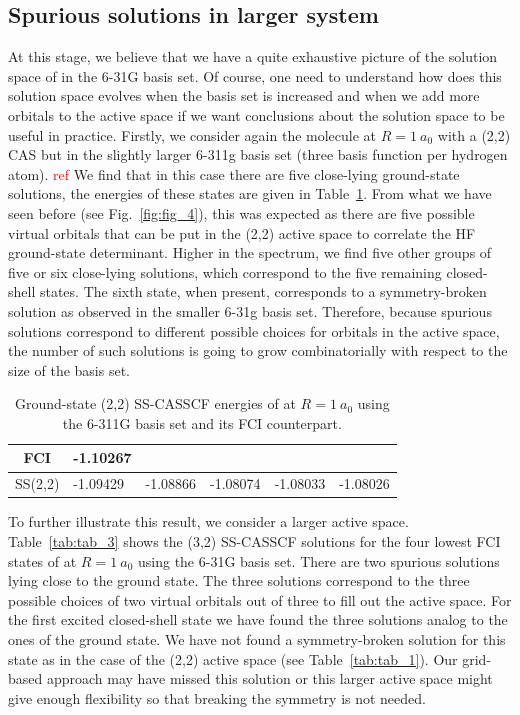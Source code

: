 \documentclass[aps,prb,reprint,showkeys,superscriptaddress]{revtex4-1}
\newcommand{\todo}[1]{\textcolor{red}{#1}}
\begin{document}
\subsection{Spurious solutions in larger system}
\label{sec:largersystem}

At this stage, we believe that we have a quite exhaustive picture of the solution space of  in the 6-31G basis set.
Of course, one need to understand how does this solution space evolves when the basis set is increased and when we add more orbitals to the active space if we want conclusions about the solution space to be useful in practice.
Firstly, we consider again the  molecule at $R=1~a_0$ with a (2,2) CAS but in the slightly larger 6-311g basis set (three basis function per hydrogen atom). \todo{ref}
We find that in this case there are five close-lying ground-state solutions, the energies of these states are given in Table~\ref{tab:tab_2}.
From what we have seen before (see Fig.~\ref{fig:fig_4}), this was expected as there are five possible virtual orbitals that can be put in the (2,2) active space to correlate the HF ground-state determinant.
Higher in the spectrum, we find five other groups of five or six close-lying solutions, which correspond to the five remaining closed-shell states.
The sixth state, when present, corresponds to a symmetry-broken solution as observed in the smaller 6-31g basis set.
Therefore, because spurious solutions correspond to different possible choices for orbitals in the active space, the number of such solutions is going to grow combinatorially with respect to the size of the basis set.

\begin{table}[h!]
  \caption{Ground-state (2,2) SS-CASSCF energies of  at $R=1~a_0$ using the 6-311G basis set and its FCI counterpart.}
  \begin{ruledtabular}
    \label{tab:tab_2}
    \begin{tabular}{clllll}
      FCI & -1.10267 & & & &\\
      \hline
      SS(2,2) & -1.09429 & -1.08866 & -1.08074 & -1.08033 & -1.08026
    \end{tabular}
  \end{ruledtabular}
\end{table}

To further illustrate this result, we consider a larger active space. Table~\ref{tab:tab_3} shows the (3,2) SS-CASSCF solutions for the four lowest FCI states of  at $R=1~a_0$ using the 6-31G basis set.
There are two spurious solutions lying close to the ground state.
The three solutions correspond to the three possible choices of two virtual orbitals out of three to fill out the active space.
For the first excited closed-shell state we have found the three solutions analog to the ones of the ground state.
We have not found a symmetry-broken solution for this state as in the case of the (2,2) active space (see Table~\ref{tab:tab_1}).
Our grid-based approach may have missed this solution or this larger active space might give enough flexibility so that breaking the symmetry is not needed.
\end{document}
